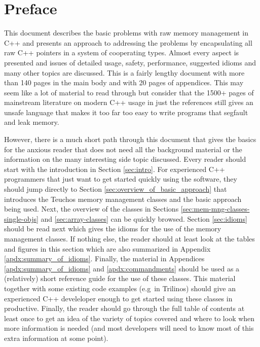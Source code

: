 \documentclass[pdf,ps2pdf,11pt]{SANDreport}
\begin{document}
%
\cleardoublepage   %
\tableofcontents
\listoffigures
\listoftables

\clearpage
\section{Preface}

This document describes the basic problems with raw memory management
in C++ and presents an approach to addressing the problems by
encapsulating all raw C++ pointers in a system of cooperating types.
Almost every aspect is presented and issues of detailed usage, safety,
performance, suggested idioms and many other topics are discussed.
This is a fairly lengthy document with more than 140 pages in the main
body and with 20 pages of appendices.  This may seem like a lot of
material to read through but consider that the 1500+ pages of
mainstream literature on modern C++ usage in just the references
{}\cite{stroustrup97, C++CodingStandards05, C++Gotchas03,
EffectiveC++ThirdEdition} still gives an unsafe language that makes it
too far too easy to write programs that segfault and leak memory.

However, there is a much short path through this document that gives
the basics for the anxious reader that does not need all the
background material or the information on the many interesting side
topic discussed.  Every reader should start with the introduction in
Section {}\ref{sec:intro}.  For experienced C++ programmers that just
want to get started quickly using the software, they should jump
directly to Section {}\ref{sec:overview_of_basic_approach} that
introduces the Teuchos memory management classes and the basic
approach being used.  Next, the overview of the classes in Sections
{}\ref{sec:mem-mng-classes-single-objs} and {}\ref{sec:array-classes}
can be quickly browsed.  Section {}\ref{sec:idioms} should be read
next which gives the idioms for the use of the memory management
classes.  If nothing else, the reader should at least look at the
tables and figures in this section which are also summarized in
Appendix {}\ref{apdx:summary_of_idioms}.  Finally, the material in
Appendices {}\ref{apdx:summary_of_idioms} and
{}\ref{apdx:commandments} should be used as a (relatively) short
reference guide for the use of these classes.  This material together
with some existing code examples (e.g\ in Trilinos) should give an
experienced C++ develeloper enough to get started using these classes
in productive.  Finally, the reader should go through the full table
of contents at least once to get an idea of the variety of topics
covered and where to look when more information is needed (and most
developers will need to know most of this extra information at some
point).
\end{document}
